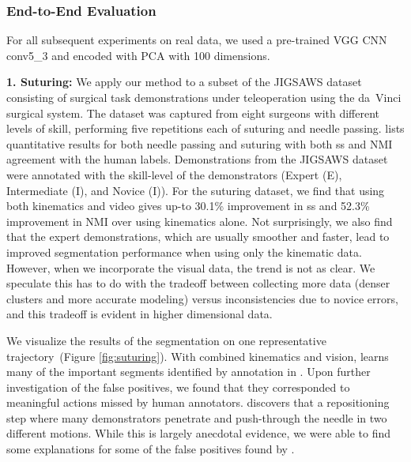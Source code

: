 \subsubsection{End-to-End Evaluation}
For all subsequent experiments on real data, we used a pre-trained VGG CNN conv5\_3 and encoded with PCA with 100 dimensions. 


\vspace{0.25em}
\noindent\textbf{1. Suturing: } 
We apply our method to a subset of the JIGSAWS dataset~\cite{gao2014jigsaws} consisting of surgical task demonstrations under teleoperation using the da~Vinci surgical system. The dataset was captured from eight surgeons with different levels of skill, performing five repetitions each of suturing and needle passing.
 lists quantitative results for both needle passing and suturing with both \textsf{ss} and NMI agreement with the human labels.
Demonstrations from the JIGSAWS dataset were annotated with the skill-level of the demonstrators (Expert (E), Intermediate (I), and Novice (I)).
For the suturing dataset, we find that using both kinematics and video gives up-to 30.1\% improvement in \textsf{ss} and 52.3\% improvement in NMI over using kinematics alone.
Not surprisingly, we also find that the expert demonstrations, which are usually smoother and faster, lead to improved segmentation performance when using only the kinematic data.
However, when we incorporate the visual data, the trend is not as clear.
We speculate this has to do with the tradeoff between collecting more data (denser clusters and more accurate modeling) versus inconsistencies due to novice errors, and this tradeoff is evident in higher dimensional data.

We visualize the results of the segmentation on one representative trajectory~(Figure \ref{fig:suturing}).
With combined kinematics and vision, \tsc learns many of the important segments identified by annotation in \cite{gao2014jigsaws}.
Upon further investigation of the false positives, we found that they corresponded to meaningful actions missed by human annotators.
\tsc discovers that a repositioning step where many demonstrators penetrate and push-through the needle in two different motions.
While this is largely anecdotal evidence, we were able to find some explanations for some of the false positives found by \tsc.


